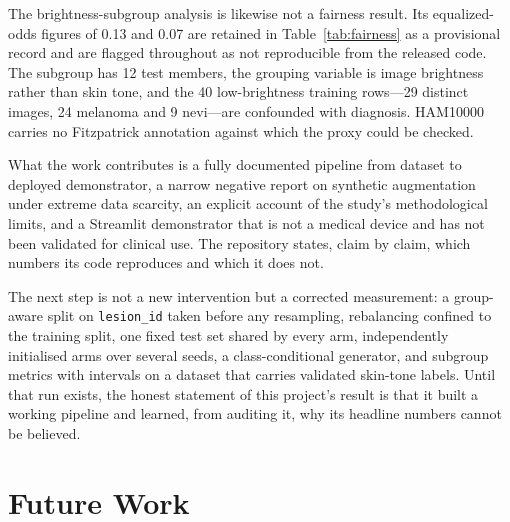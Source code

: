 \documentclass[ai,article,submit,pdftex,moreauthors]{Definitions/mdpi}
\begin{document}
The brightness-subgroup analysis is likewise not a fairness result. Its equalized-odds figures of 0.13 and 0.07 are retained in Table~\ref{tab:fairness} as a provisional record and are flagged throughout as not reproducible from the released code. The subgroup has 12 test members, the grouping variable is image brightness rather than skin tone, and the 40 low-brightness training rows---29 distinct images, 24 melanoma and 9 nevi---are confounded with diagnosis. HAM10000 carries no Fitzpatrick annotation against which the proxy could be checked.

What the work contributes is a fully documented pipeline from dataset to deployed demonstrator, a narrow negative report on synthetic augmentation under extreme data scarcity, an explicit account of the study's methodological limits, and a Streamlit demonstrator that is not a medical device and has not been validated for clinical use. The repository states, claim by claim, which numbers its code reproduces and which it does not.

The next step is not a new intervention but a corrected measurement: a group-aware split on \texttt{lesion\_id} taken before any resampling, rebalancing confined to the training split, one fixed test set shared by every arm, independently initialised arms over several seeds, a class-conditional generator, and subgroup metrics with intervals on a dataset that carries validated skin-tone labels. Until that run exists, the honest statement of this project's result is that it built a working pipeline and learned, from auditing it, why its headline numbers cannot be believed.

\section{Future Work}
\end{document}

